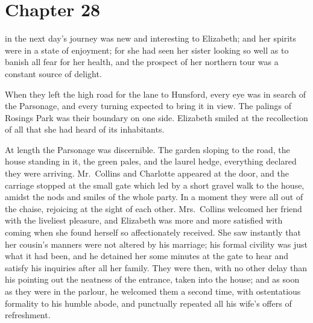\chapter{Chapter 28}


 in the next day's journey was new and interesting
to Elizabeth; and her spirits were in a state of enjoyment; for
she had seen her sister looking so well as to banish all fear for
her health, and the prospect of her northern tour was a constant
source of delight.

When they left the high road for the lane to Hunsford, every eye
was in search of the Parsonage, and every turning expected to
bring it in view.  The palings of Rosings Park was their boundary
on one side.  Elizabeth smiled at the recollection of all that she
had heard of its inhabitants.

At length the Parsonage was discernible.  The garden sloping to
the road, the house standing in it, the green pales, and the laurel
hedge, everything declared they were arriving.  Mr.\ Collins and
Charlotte appeared at the door, and the carriage stopped at the
small gate which led by a short gravel walk to the house, amidst
the nods and smiles of the whole party.  In a moment they were
all out of the chaise, rejoicing at the sight of each other.
Mrs.\ Collins welcomed her friend with the liveliest pleasure,
and Elizabeth was more and more satisfied with coming when she
found herself so affectionately received.  She saw instantly that
her cousin's manners were not altered by his marriage; his formal
civility was just what it had been, and he detained her some
minutes at the gate to hear and satisfy his inquiries after
all her family.  They were then, with no other delay than his
pointing out the neatness of the entrance, taken into the house;
and as soon as they were in the parlour, he welcomed them a
second time, with ostentatious formality to his humble abode,
and punctually repeated all his wife's offers of refreshment.

